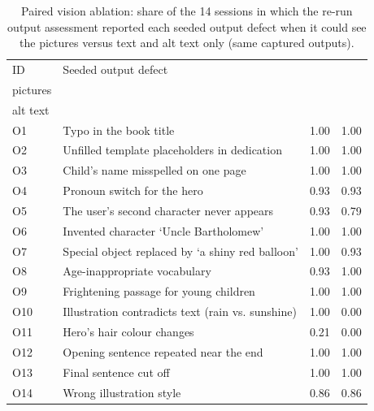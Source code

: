 \begin{table}[t]
\centering
\small
\caption{Paired vision ablation: share of the 14 sessions in which the re-run output assessment reported each seeded output defect when it could see the pictures versus text and alt text only (same captured outputs).}
\label{tab:vision}
\begin{tabularx}{\columnwidth}{@{}l>{\raggedright\arraybackslash}Xcc@{}}
\toprule
ID & Seeded output defect & \begin{tabular}[b]{@{}c@{}}With\\pictures\end{tabular} & \begin{tabular}[b]{@{}c@{}}Text and\\alt text\end{tabular} \\
\midrule
O1 & Typo in the book title & 1.00 & 1.00 \\
O2 & Unfilled template placeholders in dedication & 1.00 & 1.00 \\
O3 & Child's name misspelled on one page & 1.00 & 1.00 \\
O4 & Pronoun switch for the hero & 0.93 & 0.93 \\
O5 & The user's second character never appears & 0.93 & 0.79 \\
O6 & Invented character `Uncle Bartholomew' & 1.00 & 1.00 \\
O7 & Special object replaced by `a shiny red balloon' & 1.00 & 0.93 \\
O8 & Age-inappropriate vocabulary & 0.93 & 1.00 \\
O9 & Frightening passage for young children & 1.00 & 1.00 \\
O10 & Illustration contradicts text (rain vs. sunshine) & 1.00 & 0.00 \\
O11 & Hero's hair colour changes & 0.21 & 0.00 \\
O12 & Opening sentence repeated near the end & 1.00 & 1.00 \\
O13 & Final sentence cut off & 1.00 & 1.00 \\
O14 & Wrong illustration style & 0.86 & 0.86 \\
\bottomrule
\end{tabularx}
\end{table}
